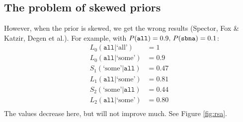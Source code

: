 \documentclass[12pt, a4paper, usenames, dvipsnames]{article}
\begin{document}
\subsection{The problem of skewed priors}
However, when the prior is skewed, we get the wrong results (Spector, Fox \& Katzir, Degen et al.). For example, with \(P(\texttt{all})=0.9$, $P(\texttt{sbna})=0.1\):
\begin{align*}
  L_0(\texttt{all}|\text{`all'}) & = 1\\
  L_0(\texttt{all}|\text{`some'}) & = 0.9\\
  S_1(\text{`some'}|\texttt{all}) & = 0.47\\
  L_1(\texttt{all}|\text{`some'}) & = 0.81\\
  S_2(\text{`some'}|\texttt{all}) & = 0.44\\
  L_2(\texttt{all}|\text{`some'}) & = 0.80\\
\end{align*}
The values decrease here, but will not improve much. See Figure \ref{fig:rsa}.
\end{document}
